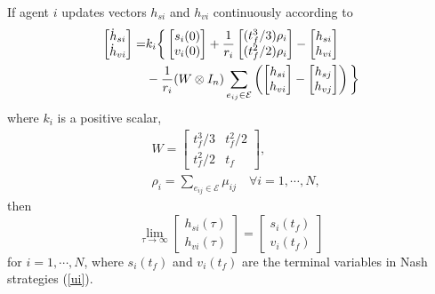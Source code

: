 \documentclass[letterpaper, 10 pt, conference,onecolumn]{ieeeconf}  %
\begin{document}
\begin{thm}\label{Thm1}
If agent $i$ updates vectors $h_{si}$ and $h_{vi}$ continuously according to
{\begin{align}
\begin{bmatrix}
\dot{h}_{si}\\
\dot{h}_{vi}
\end{bmatrix}=&k_i\bigg\{\begin{bmatrix}
s_{i}(0)\\
v_{i}(0)
\end{bmatrix}+\frac{1}{r_i}\begin{bmatrix}
(t_f^3/3)\rho_i\\
(t_f^2/2)\rho_i
\end{bmatrix}-\begin{bmatrix}
h_{si}\\
h_{vi}
\end{bmatrix}\notag\\
&-\frac{1}{r_i}(W\otimes I_n)\sum_{e_{ij}\in\mathcal{E}}\left(\begin{bmatrix}
h_{si}\\
h_{vi}
\end{bmatrix}-\begin{bmatrix}
h_{sj}\\
h_{vj}
\end{bmatrix}\right)\bigg\}\label{update}
\end{align}}
where $k_i$ is a positive scalar,
\begin{align}
&W=\begin{bmatrix}
t_f^3/3&t_f^2/2\\
t_f^2/2&t_f
\end{bmatrix}\label{W},\\
&\rho_i=\sum_{e_{ij}\in\mathcal{E}}\mu_{ij}\quad\forall i=1,\cdots,N,\label{mui}
\end{align}
then
\begin{equation}
\lim_{\tau\rightarrow\infty}\begin{bmatrix}
h_{si}(\tau)\\
h_{vi}(\tau)
\end{bmatrix}=\begin{bmatrix}
s_i(t_f)\\
v_i(t_f)
\end{bmatrix}
\label{limit}
\end{equation}
for $i=1,\cdots,N$, where $s_i(t_f)$ and $v_i(t_f)$ are the terminal variables {in} Nash strategies (\ref{ui}).
\end{thm}
\end{document}
